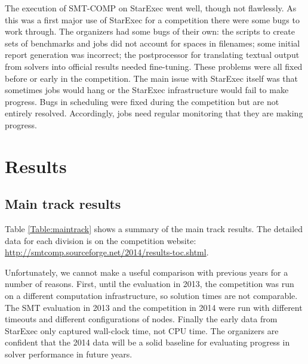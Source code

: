 \documentclass[twoside,11pt]{article}
\begin{document}
The execution of SMT-COMP on StarExec went well, though not flawlessly. As this was a first major use of StarExec for a competition there were some bugs to work through.
The organizers had some bugs of their own: the scripts to create sets of benchmarks and jobs did not account for spaces in filenames; some initial report generation was incorrect; the postprocessor for translating textual output from solvers into official results needed fine-tuning. These problems were all fixed before or early in the competition. The main issue with StarExec itself was that sometimes jobs would hang or the StarExec infrastructure would fail to make progress. Bugs in scheduling were
fixed during the competition but are not entirely resolved. Accordingly, jobs need regular monitoring that they are making progress.

\section{Results}
\label{sec:results}

\subsection{Main track results}
\label{sec:timeouts}

Table \ref{Table:maintrack} shows a summary of the main track results. The detailed data for each division is on the competition website: \url{http://smtcomp.sourceforge.net/2014/results-toc.shtml}.

Unfortunately, we cannot make a useful comparison with previous years for a number of reasons. First, until the evaluation in 2013, the competition was run on a different computation infrastructure, so solution times are not comparable. The SMT evaluation in 2013 and the competition in 2014 were run with different timeouts and different configurations of nodes. Finally the early data from StarExec only captured wall-clock time, not CPU time. The organizers are confident that the 2014 data will be a solid baseline for evaluating progress in solver performance in future years.
 
\end{document}
